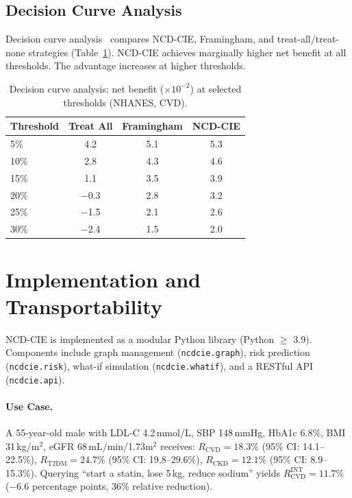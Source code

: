 \documentclass[runningheads]{llncs}
\begin{document}
\subsection{Decision Curve Analysis}\label{sec:dca}

Decision curve analysis~\cite{vickers2006dca} compares NCD-CIE,
Framingham, and treat-all/treat-none strategies
(Table~\ref{tab:dca}).
NCD-CIE achieves marginally higher net benefit at all thresholds.
The advantage increases at higher thresholds.

\renewcommand{\arraystretch}{1.2}
\begin{table}[t]
\centering
\caption{Decision curve analysis: net benefit ($\times 10^{-2}$) at
selected thresholds (NHANES, CVD).}
\label{tab:dca}
\small
\begin{tabular}{@{}lccc@{}}
\toprule
\textbf{Threshold} & \textbf{Treat All} & \textbf{Framingham} &
\textbf{NCD-CIE} \\
\midrule
5\%  & 4.2 & 5.1 & 5.3 \\
10\% & 2.8 & 4.3 & 4.6 \\
15\% & 1.1 & 3.5 & 3.9 \\
20\% & $-$0.3 & 2.8 & 3.2 \\
25\% & $-$1.5 & 2.1 & 2.6 \\
30\% & $-$2.4 & 1.5 & 2.0 \\
\bottomrule
\end{tabular}
\end{table}
\renewcommand{\arraystretch}{1.0}

\section{Implementation and Transportability}\label{sec:impl}

NCD-CIE is implemented as a modular Python library (Python $\geq$
3.9).
Components include graph management (\texttt{ncdcie.graph}),
risk prediction (\texttt{ncdcie.risk}), what-if simulation
(\texttt{ncdcie.whatif}), and a RESTful API (\texttt{ncdcie.api}).

\paragraph{Use Case.}
A 55-year-old male with LDL-C 4.2\,mmol/L, SBP 148\,mmHg, HbA1c
6.8\%, BMI 31\,kg/m$^2$, eGFR 68\,mL/min/1.73m$^2$ receives:
$R_{\text{CVD}} = 18.3\%$ (95\% CI: 14.1--22.5\%),
$R_{\text{T2DM}} = 24.7\%$ (95\% CI: 19.8--29.6\%),
$R_{\text{CKD}} = 12.1\%$ (95\% CI: 8.9--15.3\%).
Querying ``start a statin, lose 5\,kg, reduce sodium'' yields
$R_{\text{CVD}}^{\text{INT}} = 11.7\%$ ($-$6.6 percentage points,
36\% relative reduction).
\end{document}
